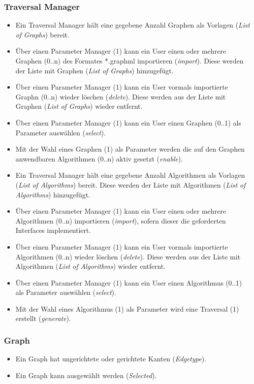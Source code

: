 \subsubsection{Traversal Manager}
\label{subsubsec:Traversal Manager}
\begin{itemize}
  \item Ein Traversal Manager h\"alt eine gegebene Anzahl Graphen als Vorlagen (\textit{List of Graphs}) bereit.
  \item \"Uber einen Parameter Manager (1) kann ein User einen oder mehrere Graphen (0..n) des Formates *.graphml importieren (\textit{import}). Diese werden der Liste mit Graphen (\textit{List of Graphs}) hinzugef\"ugt.
  \item \"Uber einen Parameter Manager (1) kann ein User vormals importierte Graphn (0..n) wieder l\"oschen (\textit{delete}). Diese werden aus der Liste mit Graphen (\textit{List of Graphs}) wieder entfernt.
  \item \"Uber einen Parameter Manager (1) kann ein User einen Graphen (0..1) als Parameter ausw\"ahlen (\textit{select}).
  \item Mit der Wahl eines Graphen (1) als Parameter werden die auf den Graphen anwendbaren Algorithmen (0..n) aktiv gesetzt (\textit{enable}).
  \item Ein Traversal Manager h\"alt eine gegebene Anzahl Algorithmen als Vorlagen (\textit{List of Algorithms}) bereit. Diese werden der Liste mit Algorithmen (\textit{List of Algorithms}) hinzugef\"ugt.
  \item \"Uber einen Parameter Manager (1) kann ein User einen oder mehrere Algorithmen (0..n) importieren (\textit{import}), sofern dieser die geforderten Interfaces implementiert.
  \item \"Uber einen Parameter Manager (1) kann ein User vormals importierte Algorithmen (0..n) wieder l\"oschen (\textit{delete}). Diese werden aus der Liste mit Algorithmen (\textit{List of Algorithms}) wieder entfernt.
  \item \"Uber einen Parameter Manager (1) kann ein User einen Algorithmus (0..1) als Parameter ausw\"ahlen (\textit{select}).
  \item Mit der Wahl eines Algorithmus (1) als Parameter wird eine Traversal (1) erstellt (\textit{generate}).
\end{itemize}
% 
\subsubsection{Graph}
\label{subsubsec:Graph}
\begin{itemize}
  \item Ein Graph hat ungerichtete oder gerichtete Kanten (\textit{Edgetype}).
  \item Ein Graph kann ausgew\"ahlt werden (\textit{Selected}).
\end{itemize}
% 
